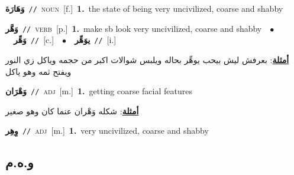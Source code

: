 \documentclass[10pt,a4paper,twoside]{article} %
\begin{document}
\begin{multicols}{2}
{\setlength\topsep{0pt}\textbf{\foreignlanguage{arabic}{وَهَارَة}}\ {\color{gray}\texttt{//}\color{black}}\ \textsc{noun}\ [f.]\ \textbf{1.}~the state of being very uncivilized, coarse and shabby\ } \vspace{2mm}

{\setlength\topsep{0pt}\textbf{\foreignlanguage{arabic}{وَهَّر}}\ {\color{gray}\texttt{//}\color{black}}\ \textsc{verb}\ [p.]\ \textbf{1.}~make sb look very uncivilized, coarse and shabby\ \ $\bullet$\ \ \setlength\topsep{0pt}\textbf{\foreignlanguage{arabic}{وَهِّر}}\ {\color{gray}\texttt{//}\color{black}}\ [c.]\ \ $\bullet$\ \ \setlength\topsep{0pt}\textbf{\foreignlanguage{arabic}{يوَهِّر}}\ {\color{gray}\texttt{//}\color{black}}\ [i.]\  \begin{flushright}\color{gray}\foreignlanguage{arabic}{\textbf{\underline{\foreignlanguage{arabic}{أمثلة}}}: بعرفش ليش بيحب يوهِّر بحاله ويلبس شوالات اكبر من حجمه وياكل زي النور ويفتح ثمه وهو ياكل}\end{flushright}\color{black}} \vspace{2mm}

{\setlength\topsep{0pt}\textbf{\foreignlanguage{arabic}{وَهْرَان}}\ {\color{gray}\texttt{//}\color{black}}\ \textsc{adj}\ [m.]\ \textbf{1.}~getting coarse facial features\  \begin{flushright}\color{gray}\foreignlanguage{arabic}{\textbf{\underline{\foreignlanguage{arabic}{أمثلة}}}: شكله وَهْران عنما كان وهو صغير}\end{flushright}\color{black}} \vspace{2mm}

{\setlength\topsep{0pt}\textbf{\foreignlanguage{arabic}{وِهِر}}\ {\color{gray}\texttt{//}\color{black}}\ \textsc{adj}\ [m.]\ \textbf{1.}~very uncivilized, coarse and shabby\ } \vspace{2mm}

\vspace{-3mm}
\subsection*{\color{blue}\foreignlanguage{arabic}{و.ه.م}\color{blue}{}} 


\end{multicols}
\end{document}
